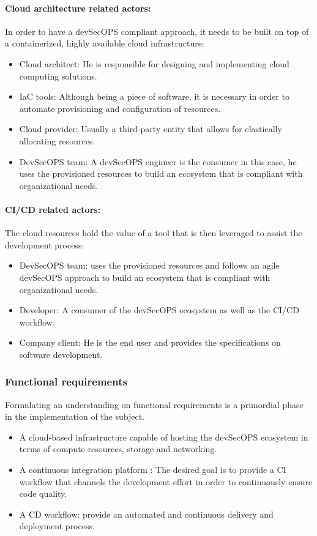 \paragraph{Cloud architecture related actors:}
In order to have a devSecOPS compliant approach, it needs to be built on top of a containerized, highly available cloud infrastructure:
\begin{itemize}[label={--}]
\item Cloud architect: He is responsible for designing and implementing cloud computing solutions.
\item IaC tools: Although being a piece of software, it is necessary in order to automate provisioning and configuration of resources.
\item Cloud provider: Usually a third-party entity that allows for elastically allocating resources.
\item DevSecOPS team: A devSecOPS engineer is the consumer in this case, he uses the provisioned resources to build an ecosystem that is compliant with organizational needs.
\end{itemize}

\paragraph{CI/CD related actors:}
The cloud resources hold the value of a tool that is then leveraged to assist the development process:
\begin{itemize}[label={--}]
\item DevSecOPS team: uses the provisioned resources and follows an agile devSecOPS approach to build an ecosystem that is compliant with organizational needs.
\item Developer: A consumer of the devSecOPS ecosystem as well as the CI/CD workflow.
\item Company client: He is the end user and provides the specifications on software development.
\end{itemize}

\subsubsection{Functional requirements}

Formulating an understanding on functional requirements is a primordial phase in the implementation of the subject.

\begin{itemize}[label={--}]
\item A cloud-based infrastructure capable of hosting the devSecOPS ecosystem in terms of compute resources, storage and networking.
\item A continuous integration platform : The desired goal is to provide a CI workflow that channels the development effort in order to continuously ensure code quality.
\item A CD workflow: provide an automated and continuous delivery and deployment process.
\end{itemize}

